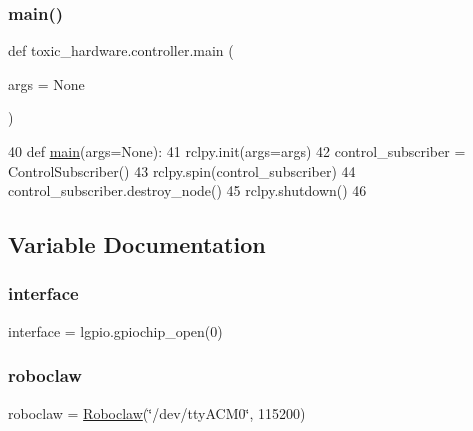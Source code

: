 \subsubsection{\texorpdfstring{main()}{main()}}
{\footnotesize\ttfamily def toxic\+\_\+hardware.\+controller.\+main (\begin{DoxyParamCaption}\item[{}]{args = {\ttfamily None} }\end{DoxyParamCaption})}


\begin{DoxyCode}
40 \textcolor{keyword}{def }\mbox{\hyperlink{namespacetoxic__hardware_1_1controller_aac60e1fb14a23592e007ebec1efc50a4}{main}}(args=None):
41     rclpy.init(args=args)
42     control\_subscriber = ControlSubscriber()
43     rclpy.spin(control\_subscriber)
44     control\_subscriber.destroy\_node()
45     rclpy.shutdown()
46 
\end{DoxyCode}


\subsection{Variable Documentation}
\mbox{\label{namespacetoxic__hardware_1_1controller_ae6deea6e7d03b5d4db98ea209159e57f}} 
\subsubsection{\texorpdfstring{interface}{interface}}
{\footnotesize\ttfamily interface = lgpio.\+gpiochip\+\_\+open(0)}

\mbox{\label{namespacetoxic__hardware_1_1controller_a257386444c3afd4030922ffb828f85fe}} 
\subsubsection{\texorpdfstring{roboclaw}{roboclaw}}
{\footnotesize\ttfamily roboclaw = \mbox{\hyperlink{classtoxic__hardware_1_1roboclaw__3_1_1Roboclaw}{Roboclaw}}(\char`\"{}/dev/tty\+A\+C\+M0\char`\"{}, 115200)}

